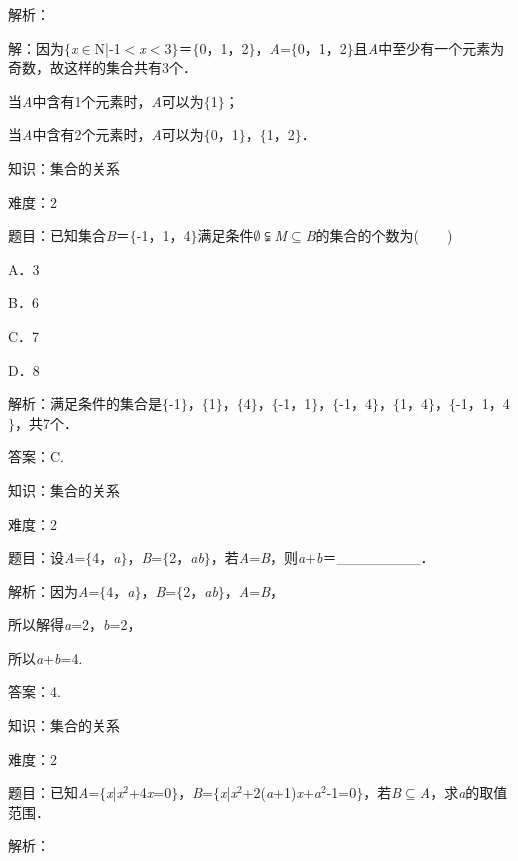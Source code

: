 \documentclass{article} %
\begin{document}
解析：

解：因为$\mathrm{\{}$\textit{x}$\mathrm{\in}$N|-1$\mathrm{<}$\textit{x}$\mathrm{<}$3$\mathrm{\}}$＝$\mathrm{\{}$0，1，2$\mathrm{\}}$，\textit{A}=$\mathrm{\{}$0，1，2$\mathrm{\}}$且\textit{A}中至少有一个元素为奇数，故这样的集合共有3个．

当\textit{A}中含有1个元素时，\textit{A}可以为$\mathrm{\{}$1$\mathrm{\}}$；

当\textit{A}中含有2个元素时，\textit{A}可以为$\mathrm{\{}$0，1$\mathrm{\}}$，$\mathrm{\{}$1，2$\mathrm{\}}$．

知识：集合的关系

难度：2

题目：已知集合\textit{B}＝$\mathrm{\{}$-1，1，4$\mathrm{\}}$满足条件$\mathrm{\emptyset}$$\subsetneqq$\textit{M}$\mathrm{\subseteq}$\textit{B}的集合的个数为(　　)

A．3  

B．6  

C．7  

D．8

解析：满足条件的集合是$\mathrm{\{}$-1$\mathrm{\}}$，$\mathrm{\{}$1$\mathrm{\}}$，$\mathrm{\{}$4$\mathrm{\}}$，$\mathrm{\{}$-1，1$\mathrm{\}}$，$\mathrm{\{}$-1，4$\mathrm{\}}$，$\mathrm{\{}$1，4$\mathrm{\}}$，$\mathrm{\{}$-1，1，4$\mathrm{\}}$，共7个．

答案：C.

知识：集合的关系

难度：2

题目：设\textit{A}=$\mathrm{\{}$4，\textit{a}$\mathrm{\}}$，\textit{B}=$\mathrm{\{}$2，\textit{ab}$\mathrm{\}}$，若\textit{A}=\textit{B}，则\textit{a}+\textit{b}＝\_\_\_\_\_\_\_\_．

解析：因为\textit{A}=$\mathrm{\{}$4，\textit{a}$\mathrm{\}}$，\textit{B}=$\mathrm{\{}$2，\textit{ab}$\mathrm{\}}$，\textit{A}=\textit{B}，

所以解得\textit{a}=2，\textit{b}=2，

所以\textit{a}+\textit{b}=4.

答案：4.

知识：集合的关系

难度：2

题目：已知\textit{A}=$\mathrm{\{}$\textit{x}|\textit{x}${}^{2}$+4\textit{x}=0$\mathrm{\}}$，\textit{B}=$\mathrm{\{}$\textit{x}|\textit{x}${}^{2}$+2(\textit{a}+1)\textit{x}+\textit{a}${}^{2}$-1=0$\mathrm{\}}$，若\textit{B}$\mathrm{\subseteq}$\textit{A}，求\textit{a}的取值范围．

解析：
\end{document}
